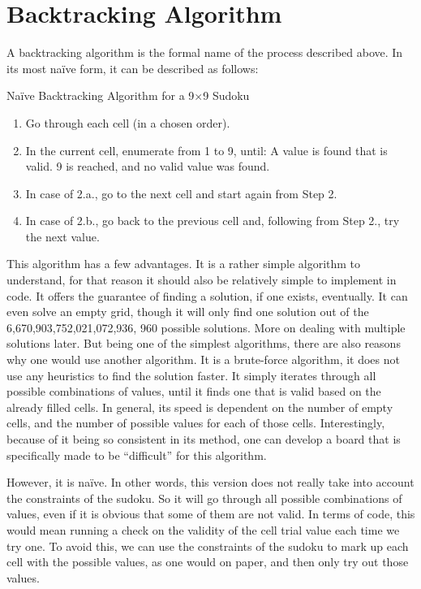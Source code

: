 \documentclass[12pt]{report} %
\begin{document}
\section{Backtracking Algorithm}

A backtracking algorithm is the formal name of the process described above\cite{cornell_sudoku}.
In its most naïve form, it can be described as follows:


\begin{definitionbox}{Naïve Backtracking Algorithm for a 9$\times$9 Sudoku}

  \begin{enumerate}
    \item Go through each cell (in a chosen order).
    \item In the current cell, enumerate from 1 to 9, until:
     A value is found that is valid.
     9 is reached, and no valid value was found.
    \item In case of 2.a., go to the next cell and start again from Step 2.
    \item In case of 2.b., go back to the previous cell and, following from Step 2., try the next value.
  \end{enumerate}

\end{definitionbox}

\vspace*{1\baselineskip}
This algorithm has a few advantages. It is a rather simple algorithm to understand, for that reason it should also be relatively simple to implement in code. It offers the guarantee of finding a solution, if one exists, eventually. It can even solve an empty grid, though it will only find one solution out of the 6,670,903,752,021,072,936, 960 possible solutions\cite{cornell_sudoku3}. More on dealing with multiple solutions later.
But being one of the simplest algorithms, there are also reasons why one would use another algorithm. It is a brute-force algorithm, it does not use any heuristics to find the solution faster. It simply iterates through all possible combinations of values, until it finds one that is valid based on the already filled cells. In general, its speed is dependent on the number of empty cells, and the number of possible values for each of those cells. Interestingly, because of it being so consistent in its method, one can develop a board that is specifically made to be ``difficult'' for this algorithm.

However, it is naïve. In other words, this version does not really take into account the constraints of the sudoku. So it will go through all possible combinations of values, even if it is obvious that some of them are not valid. In terms of code, this would mean running a check on the validity of the cell trial value each time we try one. To avoid this, we can use the constraints of the sudoku to mark up each cell with the possible values, as one would on paper, and then only try out those values.
\end{document}
